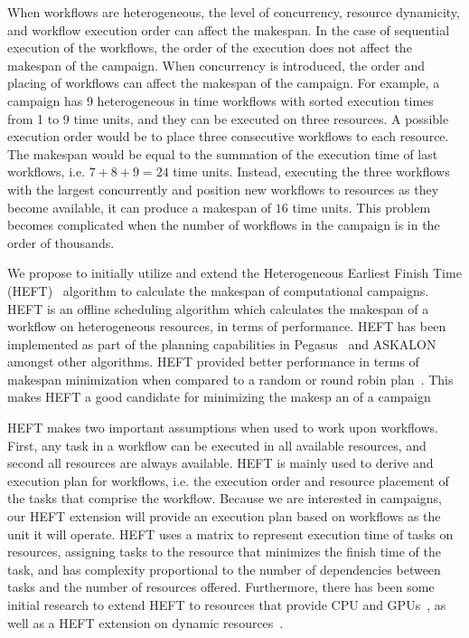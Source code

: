 When workflows are heterogeneous, the level of concurrency, resource dynamicity, and workflow execution order can affect the makespan.
In the case of sequential execution of the workflows, the order of the execution does not affect the makespan of the campaign.
When concurrency is introduced, the order and placing of workflows can affect the makespan of the campaign.
For example, a campaign has 9 heterogeneous in time workflows with sorted execution times from 1 to 9 time units, and they can be executed on three resources.
A possible execution order would be to place three consecutive workflows to each resource.
The makespan would be equal to the summation of the execution time of last workflows, i.e. $7 + 8 + 9 = 24$ time units.
Instead, executing the three workflows with the largest concurrently and position new workflows to resources as they become available, it can produce a makespan of $16$ time units.
This problem becomes complicated when the number of workflows in the campaign is in the order of thousands.



We propose to initially utilize and extend the Heterogeneous Earliest Finish Time (HEFT)~\cite{topcuoglu2002performance} algorithm to calculate the makespan of computational campaigns.
HEFT is an offline scheduling algorithm which calculates the makespan of a workflow on heterogeneous resources, in terms of performance.
HEFT has been implemented as part of the planning capabilities in Pegasus~\cite{deelman2015pegasus} and ASKALON~\cite{fahringer2005askalon} amongst other algorithms.
HEFT provided better performance in terms of makespan minimization when compared to a random or round robin plan~\cite{deelman2015pegasus}.
This makes HEFT a good candidate for minimizing the makesp an of a campaign


HEFT makes two important assumptions when used to work upon workflows.
First, any task in a workflow can be executed in all available resources, and second all resources are always available.
HEFT is mainly used to derive and execution plan for workflows, i.e. the execution order and resource placement of the tasks that comprise the workflow.
Because we are interested in campaigns, our HEFT extension will provide an execution plan based on workflows as the unit it will operate.
HEFT uses a matrix to represent execution time of tasks on resources, assigning tasks to the resource that minimizes the finish time of the task, and has complexity proportional to the number of dependencies between tasks and the number of resources offered.
Furthermore, there has been some initial research to extend HEFT to resources that provide CPU and GPUs~\cite{shetti2013optimization}, as well as a HEFT extension on dynamic resources~\cite{dong2007pfas}.

